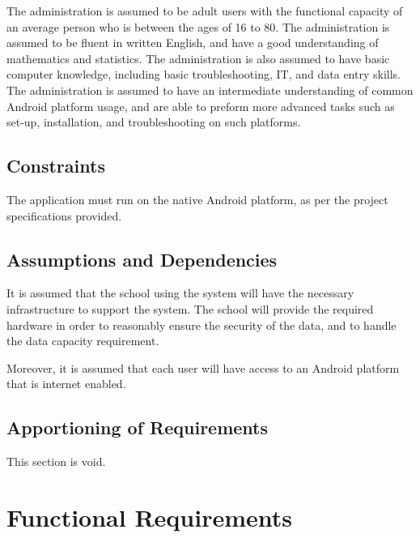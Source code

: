 \documentclass[]{article}
\begin{document}
The administration is assumed to be adult users with the functional capacity of
an average person who is between the ages of 16 to 80. The administration is
assumed to be fluent in written English, and have a good understanding of
mathematics and statistics. The administration is also assumed to have basic
computer knowledge, including basic troubleshooting, IT, and data entry skills.
The administration is assumed to have an intermediate understanding of common
Android platform usage, and are able to preform more advanced tasks such as
set-up, installation, and troubleshooting on such platforms.

\subsection{Constraints}
\label{sub:constraints}
The application must run on the native Android platform, as per the project
specifications provided.

\subsection{Assumptions and Dependencies}
\label{sub:assumptions_and_dependencies}
It is assumed that the school using the system will have the necessary infrastructure to support the system. The school will provide the required hardware in order to reasonably ensure the security of the data, and to handle the data capacity requirement.

Moreover, it is assumed that each user will have access to an Android platform that is internet enabled.

\subsection{Apportioning of Requirements}
\label{sub:apportioning_of_requirements}
This section is void.


\section{Functional Requirements}
\label{sec:functional_requirements}
\end{document}
